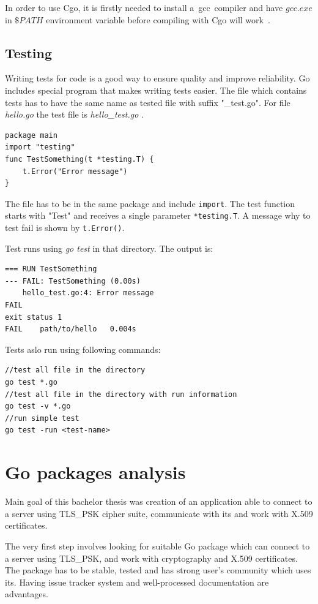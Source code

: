 \documentclass[
  12pt, 
  digital, %
  notable,   %
  nolof,     %
  nolot,     %
]{fithesis3}
\begin{document}
In order to use Cgo, it is firstly needed to install a~gcc~compiler and have $gcc.exe$ in $\$PATH$ 
environment variable before compiling with Cgo will work~\cite{bloggolangorg,cgo-wiki}.

\section{Testing}

Writing tests for code is a good way to ensure quality and improve reliability. Go includes special program that makes writing tests easier. The file which contains tests has to have the same name as tested file with suffix "\_test.go". For file \textit{hello.go} the test file is \textit{hello\_test.go} \cite{chisnall2012go,testblog}.
\begin{lstlisting}
package main
import "testing"
func TestSomething(t *testing.T) {
	t.Error("Error message")
}
\end{lstlisting}
The file has to be in the same package and include \texttt{import}. The test function starts with "Test" and receives a single parameter \texttt{*testing.T}. A message why to test fail is shown by \texttt{t.Error()}. 

Test runs using \textit{go test} in that directory. The output is:
\begin{lstlisting}
=== RUN TestSomething
--- FAIL: TestSomething (0.00s)
	hello_test.go:4: Error message
FAIL
exit status 1
FAIL	path/to/hello	0.004s
\end{lstlisting}
Tests aslo run using following commands:
\begin{lstlisting}
//test all file in the directory
go test *.go 
//test all file in the directory with run information
go test -v *.go 
//run simple test
go test -run <test-name> 
\end{lstlisting}

\chapter{Go packages analysis} \label{packageAnalysis}%

Main goal of this bachelor thesis was creation of an application able to connect to a server using 
TLS\_PSK cipher suite, communicate with its and work with X.509 certificates. 

The very first step involves looking for suitable Go package which can connect to a server using 
TLS\_PSK, and work with cryptography and X.509 certificates. The package has to be stable, tested 
and has strong user's community which uses its. Having issue tracker system and well-processed documentation are advantages.
\end{document}
